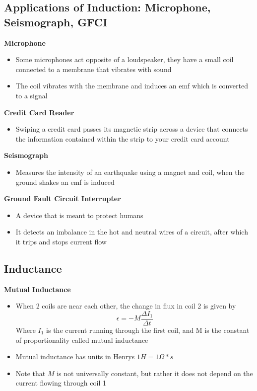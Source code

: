\subsection{Applications of Induction: Microphone, Seismograph, GFCI}
\textbf{Microphone}
\begin{itemize}
    \item Some microphones act opposite of a loudspeaker, they have a small coil connected to a membrane that vibrates with sound 
    \item The coil vibrates with the membrane and induces an emf which is converted to a signal
\end{itemize}

\textbf{Credit Card Reader}
\begin{itemize}
    \item Swiping a credit card passes its magnetic strip across a device that connects the information contained within the strip to your credit card account
\end{itemize}

\textbf{Seismograph}
\begin{itemize}
    \item Measures the intensity of an earthquake using a magnet and coil, when the ground shakes an emf is induced 
\end{itemize}

\textbf{Ground Fault Circuit Interrupter}
\begin{itemize}
    \item A device that is meant to protect humans
    \item It detects an imbalance in the hot and neutral wires of a circuit, after which it trips and stops current flow
\end{itemize}

\subsection{Inductance}
\textbf{Mutual Inductance}
\begin{itemize}
    \item When 2 coils are near each other, the change in flux in coil 2 is given by \[\epsilon=-M\frac{\Delta I_1}{\Delta t}\] Where \(I_1\) is the current running through the first coil, and M is the constant of proportionality called mutual inductance 
    \item Mutual inductance has units in Henrys \(1H=1\Omega*s\)
    \item Note that \(M\) is not universally constant, but rather it does not depend on the current flowing through coil 1
\end{itemize}

